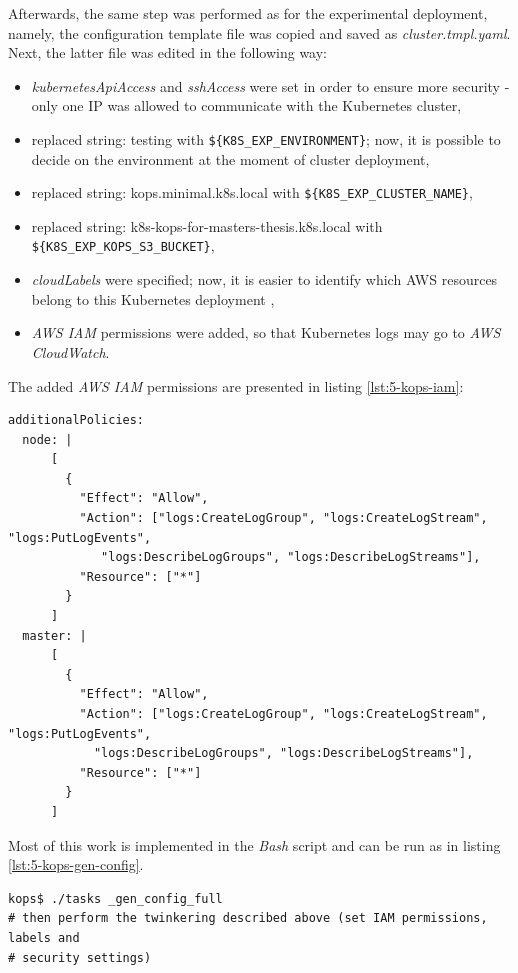 Afterwards, the same step was performed as for the experimental deployment, namely, the configuration template file was copied and saved as \textit{cluster.tmpl.yaml}. Next, the latter file was edited in the following way:
\begin{itemize}
\item \textit{kubernetesApiAccess} and \textit{sshAccess} were set in order to ensure more security - only one IP was allowed to communicate with the Kubernetes cluster,
\item replaced string: testing with \verb|${K8S_EXP_ENVIRONMENT}|; now, it is possible to decide on the environment at the moment of cluster deployment,
\item replaced string: kops.minimal.k8s.local with \verb|${K8S_EXP_CLUSTER_NAME}|,
\item replaced string: k8s-kops-for-masters-thesis.k8s.local with \verb|${K8S_EXP_KOPS_S3_BUCKET}|,
\item \textit{cloudLabels} were specified; now, it is easier to identify which AWS resources belong to this Kubernetes deployment \cite{online-kops-labels},
\item \textit{AWS IAM} permissions were added, so that Kubernetes logs may go to \textit{AWS CloudWatch}.
\end{itemize}

The added \textit{AWS IAM} permissions are presented in listing \ref{lst:5-kops-iam}:
\begin{lstlisting}[basicstyle=\scriptsize,xleftmargin=0cm,label=lst:5-kops-iam,caption={\textit{AWS IAM} permissions added to \textit{kops} cluster template needed for logging}]
additionalPolicies:
  node: |
      [
        {
          "Effect": "Allow",
          "Action": ["logs:CreateLogGroup", "logs:CreateLogStream", "logs:PutLogEvents",
             "logs:DescribeLogGroups", "logs:DescribeLogStreams"],
          "Resource": ["*"]
        }
      ]
  master: |
      [
        {
          "Effect": "Allow",
          "Action": ["logs:CreateLogGroup", "logs:CreateLogStream", "logs:PutLogEvents",
            "logs:DescribeLogGroups", "logs:DescribeLogStreams"],
          "Resource": ["*"]
        }
      ]
\end{lstlisting}

Most of this work is implemented in the \textit{Bash} script and can be run as in listing \ref{lst:5-kops-gen-config}.
\begin{lstlisting}[basicstyle=\scriptsize,xleftmargin=0cm,label=lst:5-kops-gen-config,caption={\textit{Bash} commands automating cluster configuration generation}]
kops$ ./tasks _gen_config_full
# then perform the twinkering described above (set IAM permissions, labels and
# security settings)
\end{lstlisting}

